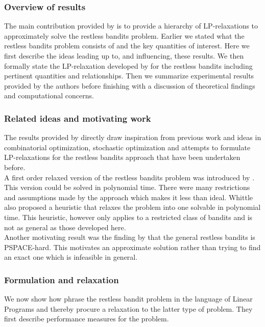 \subsubsection{Overview of results}
The main contribution provided by \citep{bertsimas} is to provide a hierarchy of LP-relaxations
to approximately solve the restless bandits problem. Earlier we stated what the restless
bandits problem consists of and the key quantities of interest. Here we first describe the ideas leading up to, and influencing, these results. We then formally state the LP-relaxation developed by \citep{bertsimas} for the restless bandits including pertinent quantities and relationships. Then we summarize experimental results provided by the authors before finishing with a discussion of theoretical findings and computational concerns.

\subsubsection{Related ideas and motivating work}
The results provided by \citep{bertsimas} directly draw inspiration from previous work and ideas in combinatorial optimization, stochastic optimization and attempts to formulate LP-relaxations for the restless bandits approach that have been undertaken before. \\ 


A first order relaxed version of the restless bandits problem was introduced by \citep{whittle}. This version could be solved in polynomial time. There were many restrictions and assumptions made by the approach which makes it less than ideal. Whittle also proposed a heuristic that relaxes the problem into one solvable in polynomial time. This heuristic, however only applies to a restricted class of bandits and is not as general as those developed here.\\

Another motivating result was the finding by \citep{papad}that the general restless bandits is PSPACE-hard. This  motivates an approximate solution rather than trying to find an exact one which is infeasible in general. \\ 

\subsubsection{Formulation and relaxation}

We now show how \citep{bertsimas} phrase the restless bandit problem in the language of Linear Programs and thereby procure a relaxation to the latter type of problem. They first describe performance measures for the problem.

